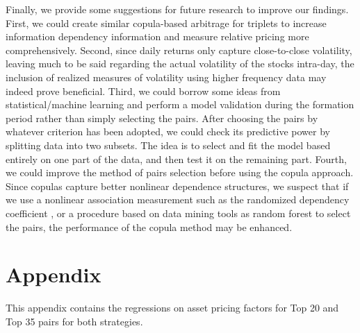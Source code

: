 \documentclass[a4paper]{article}
\begin{document}
	Finally, we provide some suggestions for future research to improve our findings. First, we could create similar copula-based arbitrage for triplets to increase information dependency information and measure relative pricing more comprehensively. Second, since daily returns only capture close-to-close volatility, leaving much to be said regarding the actual volatility of the stocks intra-day, the inclusion of realized measures of volatility using higher frequency data may indeed prove beneficial. Third, we could borrow some ideas from statistical/machine learning and perform a model validation during the formation period rather than simply selecting the pairs. After choosing the pairs by whatever criterion has been adopted, we could check its predictive power by splitting data into two subsets. The idea is to select and fit the model based entirely on one part of the data, and then test it on the remaining part. Fourth, we could improve the method of pairs selection before using the copula approach. Since copulas capture better nonlinear dependence structures, we suspect that if we use a nonlinear association measurement such as the randomized dependency coefficient \citep{lopez2013randomized}, or a procedure based on data mining tools as random forest \citep{dlrz10} to select the pairs, the performance of the copula method may be enhanced. 
	
	\vspace{1.0cm}
	
	
	
	
	\newpage
	
	\section*{Appendix}
	\vspace{0.6cm}
	
	
This appendix contains the regressions on asset pricing factors for Top 20 and Top 35 pairs for both strategies.
	
\end{document}
